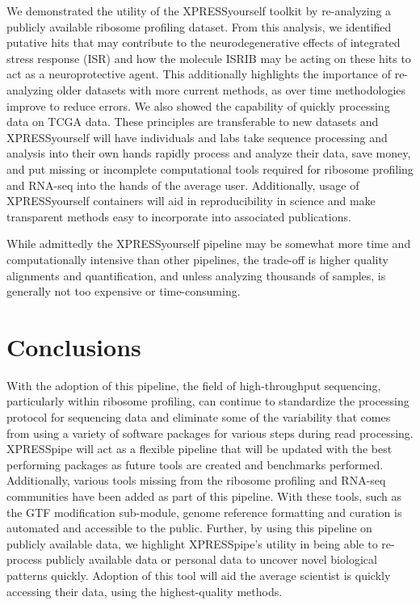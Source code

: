 \documentclass[11pt, a4paper, oneside]{article}
\begin{document}
We demonstrated the utility of the XPRESSyourself toolkit by re-analyzing a publicly available ribosome profiling dataset. From this analysis, we identified putative hits that may contribute to the neurodegenerative effects of integrated stress response (ISR) and how the molecule ISRIB may be acting on these hits to act as a neuroprotective agent. This additionally highlights the importance of re-analyzing older datasets with more current methods, as over time methodologies improve to reduce errors. We also showed the capability of quickly processing data on TCGA data. These principles are transferable to new datasets and XPRESSyourself will have individuals and labs take sequence processing and analysis into their own hands rapidly process and analyze their data, save money, and put missing or incomplete computational tools required for ribosome profiling and RNA-seq into the hands of the average user. Additionally, usage of XPRESSyourself containers will aid in reproducibility in science and make transparent methods easy to incorporate into associated publications. \par

While admittedly the XPRESSyourself pipeline may be somewhat more time and computationally intensive than other pipelines, the trade-off is higher quality alignments and quantification, and unless analyzing thousands of samples, is generally not too expensive or time-consuming.


\section{Conclusions}
With the adoption of this pipeline, the field of high-throughput sequencing, particularly within ribosome profiling, can continue to standardize the processing protocol for sequencing data and eliminate some of the variability that comes from using a variety of software packages for various steps during read processing. XPRESSpipe will act as a flexible pipeline that will be updated with the best performing packages as future tools are created and benchmarks performed. Additionally, various tools missing from the ribosome profiling and RNA-seq communities have been added as part of this pipeline. With these tools, such as the GTF modification sub-module, genome reference formatting and curation is automated and accessible to the public. Further, by using this pipeline on publicly available data, we highlight XPRESSpipe's utility in being able to re-process publicly available data or personal data to uncover novel biological patterns quickly. Adoption of this tool will aid the average scientist is quickly accessing their data, using the highest-quality methods.
\end{document}

